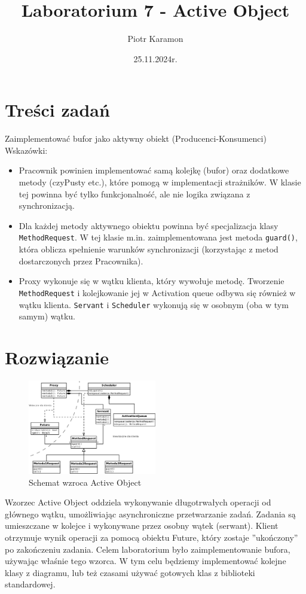 \documentclass[11pt]{article}
\author{Piotr Karamon}
\date{25.11.2024r.}
\title{Laboratorium 7 - Active Object}
\begin{document}
\maketitle
\section*{Treści zadań}
\label{sec:org311886f}
Zaimplementować bufor jako aktywny obiekt (Producenci-Konsumenci)
Wskazówki:

\begin{itemize}
\item Pracownik powinien implementować samą kolejkę (bufor) oraz dodatkowe metody
(czyPusty etc.), które pomogą w implementacji strażników. W klasie tej powinna
być tylko funkcjonalność, ale nie logika związana z synchronizacją.
\item Dla każdej metody aktywnego obiektu powinna być specjalizacja klasy
\texttt{MethodRequest}. W tej klasie m.in. zaimplementowana jest metoda \texttt{guard()}, która
oblicza spełnienie warunków synchronizacji (korzystając z metod dostarczonych
przez Pracownika).
\item Proxy wykonuje się w wątku klienta, który wywołuje metodę. Tworzenie
\texttt{MethodRequest} i kolejkowanie jej w Activation queue odbywa się również w wątku
klienta. \texttt{Servant} i \texttt{Scheduler} wykonują się w osobnym (oba w tym samym) wątku.
\end{itemize}
\section*{Rozwiązanie}
\label{sec:org3a7462e}
\begin{figure}[H]
\centering
\includegraphics[width=0.5\textwidth]{./Active_object_pl.png}
\caption{Schemat wzroca Active Object}
\end{figure}


Wzorzec Active Object oddziela wykonywanie długotrwałych operacji od głównego
wątku, umożliwiając asynchroniczne przetwarzanie zadań. Zadania są umieszczane w
kolejce i wykonywane przez osobny wątek (serwant). Klient otrzymuje wynik
operacji za pomocą obiektu Future, który zostaje ''ukończony'' po
zakończeniu zadania.
Celem laboratorium było zaimplementowanie bufora, używając właśnie tego wzorca.
W tym celu będziemy implementować kolejne klasy z diagramu, lub też czasami
używać gotowych klas z biblioteki standardowej.
\end{document}

